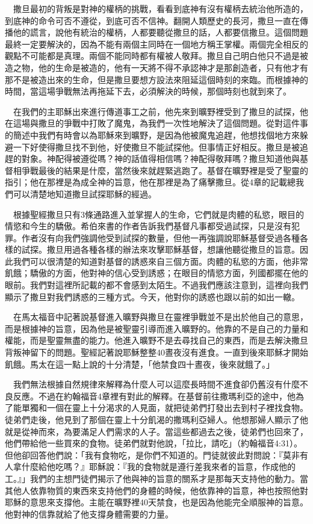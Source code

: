 \documentclass{book}
\begin{document}
　撒旦最初的背叛是對神的權柄的挑戰，看看到底神有沒有權柄去統治他所造的，到底神的命令可否不遵從，到底可否不信神。翻開人類歷史的長河，撒旦一直在傳播他的謊言，說他有統治的權柄，人都要聽從撒旦的話，人都要信撒旦。這個問題最終一定要解決的，因為不能有兩個主同時在一個地方稱王掌權。兩個完全相反的觀點不可能都是真理。兩個不能同時都有權被人敬拜。撒旦自己明白他只不過是被造之物，他的生命是被造的，他有一天將不得不承認神才是那創造者，只有他才有那不是被造出來的生命，但是撒旦要想方設法來阻延這個時刻的來臨。而根據神的時間，當這場爭戰無法再拖延下去，必須解決的時候，那個時刻也就到來了。

　在我們的主耶穌出來進行傳道事工之前，他先來到曠野裡受到了撒旦的試探，他在這場與撒旦的爭戰中打敗了魔鬼，為我們一次性地解決了這個問題。從對這件事的簡述中我們有時會以為耶穌來到曠野，是因為他被魔鬼追趕，他想找個地方來躲避一下好使得撒旦找不到他，好使撒旦不能試探他。但事情正好相反。撒旦是被追趕的對象。神配得被遵從嗎？神的話值得相信嗎？神配得敬拜嗎？撒旦知道他與基督相爭戰最後的結果是什麼，當然後來就趕緊逃跑了。基督在曠野裡是受了聖靈的指引；他在那裡是為成全神的旨意，他在那裡是為了痛擊撒旦。從4章的記載總我們可以清楚地知道撒旦試探耶穌的經過。

　根據聖經撒旦只有3條通路進入並掌握人的生命，它們就是肉體的私慾，眼目的情慾和今生的驕傲。希伯來書的作者告訴我們基督凡事都受過試探，只是沒有犯罪。作者沒有向我們強調他受到試探的數量，但他一再強調說耶穌基督受過各種各樣的試探。撒旦用過各種各樣的辦法來攻擊耶穌基督，想讓他聽從撒旦的旨意。因此我們可以很清楚的知道對基督的誘惑來自三個方面。肉體的私慾的方面，他非常飢餓；驕傲的方面，他對神的信心受到誘惑；在眼目的情慾方面，列國都擺在他的眼前。我們對這裡所記載的都不會感到太陌生。不過我們應該注意到，這裡向我們顯示了撒旦對我們誘惑的三種方式。今天，他對你的誘惑也跟以前的如出一轍。

　在馬太福音中記著說基督進入曠野與撒旦在靈裡爭戰並不是出於他自己的意思，而是根據神的旨意，因為他是被聖靈引導而進入曠野的。他靠的不是自己的力量和權能，而是聖靈無盡的能力。他進入曠野不是去尋找自己的東西，而是去解決撒旦背叛神留下的問題。聖經記著說耶穌整整40晝夜沒有進食。一直到後來耶穌才開始飢餓。馬太在這一點上說的十分清楚，「他禁食四十晝夜，後來就餓了。」

　我們無法根據自然規律來解釋為什麼人可以這麼長時間不進食卻仍舊沒有什麼不良反應。不過在約翰福音4章裡有對此的解釋。在基督前往撒瑪利亞的途中，他為了能單獨和一個在靈上十分渴求的人見面，就把徒弟們打發出去到村子裡找食物。徒弟們走後，他見到了那個在靈上十分飢渴的撒瑪利亞婦人。他想那婦人顯示了他就是從神而來，為要滿足人們需求的人子。當這些都過去之後，徒弟們也回來了，他們帶給他一些買來的食物。徒弟們就對他說，「拉比，請吃」（約翰福音4:31）。但他卻回答他們說：「我有食物吃，是你們不知道的。門徒就彼此對問說：『莫非有人拿什麼給他吃嗎？』耶穌說：『我的食物就是遵行差我來者的旨意，作成他的工。』」我們的主想門徒們揭示了他與神的旨意的關系才是那每天支持他的動力。當其他人依靠物質的東西來支持他們的身體的時候，他依靠神的旨意，神也按照他對耶穌的意思來支撐他。主能在曠野裡40天禁食，也是因為他能完全順服神的旨意。他對神的信靠就給了他支撐身體需要的力量。
\end{document}
